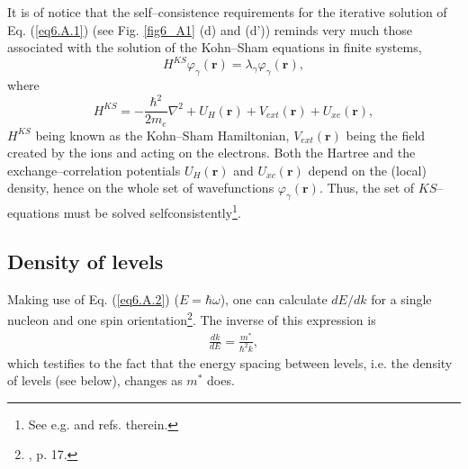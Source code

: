 \begin{subappendices}
It is of notice that the self--consistence requirements for the iterative solution of Eq. (\ref{eq6.A.1}) (see Fig. \ref{fig6_A1} (d) and (d')) reminds very much those associated with the solution of the Kohn--Sham equations in finite systems,
 \begin{equation}
 H^{KS}\varphi_\gamma(\mathbf{r})=\lambda_\gamma\varphi_\gamma(\mathbf{r}),
 \end{equation}
where
 \begin{equation}
 H^{KS}=-\frac{\hbar^2}{2 m_e}\nabla^2+U_H(\mathbf{r})+V_{ext}(\mathbf{r})+U_{xc}(\mathbf{r}),
 \end{equation}
$H^{KS}$ being known as the Kohn--Sham Hamiltonian, $V_{ext}(\mathbf{r})$ being the field created by the ions and acting on the electrons. Both the Hartree and the exchange--correlation potentials $U_H(\mathbf{r})$ and $U_{xc}(\mathbf{r})$ depend on the (local) density, hence on the whole set of wavefunctions $\varphi_\gamma(\mathbf{r})$. Thus, the set of $KS$--equations must be solved selfconsistently\footnote{See e.g. \cite{Broglia:04b} and refs. therein.}.
\subsection{Density of levels}\label{C4AppA1}
Making use of Eq. (\ref{eq6.A.2})  ($E=\hbar\omega$), one can calculate $dE/dk$ for a single nucleon and one spin orientation\footnote{\cite{Mahaux:85}, p. 17.}. The inverse of this expression is
\begin{align}
\frac{dk}{dE}=\frac{m^*}{\hbar^2k},
\end{align} 
which testifies to the fact that the energy spacing between levels, i.e. the density of levels (see below), changes as $m^*$ does.


\end{subappendices}
